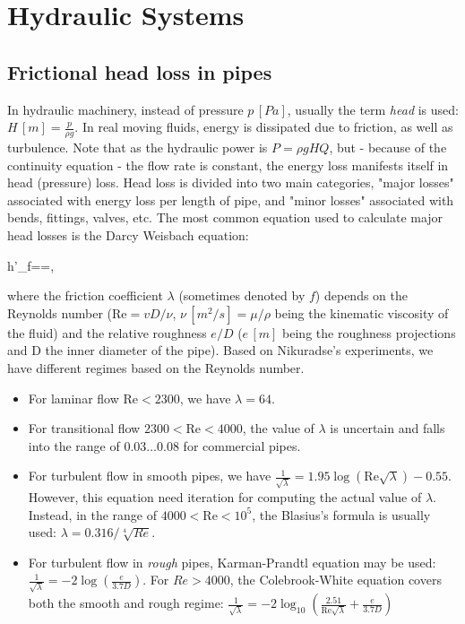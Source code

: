 \chapter{Hydraulic Systems} \label{sec:hydraulic_systems}

\section{Frictional head loss in pipes}\label{sec:frictionallosses}

In hydraulic machinery, instead of pressure $p\,[Pa]$, usually the term \emph{head} is used: $H\,[m]=\frac{p}{\rho g}$.
In real moving fluids, energy is dissipated due to friction, as well as turbulence. Note that as the hydraulic power is $P=\rho gHQ$, but - because of the continuity equation - the flow rate is constant, the energy loss manifests itself in head (pressure) loss.
Head loss is divided into two main categories, "major losses" associated with energy loss per length of pipe, and "minor losses" associated with bends, fittings, valves, etc. The most common equation used to calculate major head losses is the Darcy Weisbach equation:

\beq
h'_f=\lambda{}=\lambda{},
\eeq

where the friction coefficient $\lambda$ (sometimes denoted by $f$) depends on the Reynolds number ($\mathrm{Re}=vD/\nu$, $\nu\,[m^2/s]=\mu/\rho$ being the kinematic viscosity of the fluid) and the relative roughness $e/D$ ($e\,[m]$ being the roughness projections and D  the inner diameter of the pipe). Based on Nikuradse’s experiments, we have different regimes based on the Reynolds number.

\begin{itemize}
\item For laminar flow $\mathrm{Re} < 2300$, we have $\lambda=64$.
\item For transitional flow $2300 < \mathrm{Re} < 4000$, the value of $\lambda$ is uncertain and falls into the range of $0.03\ldots0.08$ for commercial pipes.
\item For turbulent flow in smooth pipes, we have $\frac{1}{\sqrt{\lambda}}=1.95\log(\mathrm{Re}\sqrt{\lambda})-0.55$.
However, this equation need iteration for computing the actual value of $\lambda$. Instead, in the range of $4000 < \mathrm{Re} < 10^5$, the Blasius’s formula is usually used: $\lambda=0.316/\sqrt[4]{Re}$.
\item For turbulent flow in \emph{rough} pipes, Karman-Prandtl equation  may be used: $\frac{1}{\sqrt{\lambda}}=-2\log\left(\frac{e}{3.7D}\right)$. For $Re>4000$, the  Colebrook-White  equation  covers  both the smooth  and  rough regime: $\frac{1}{\sqrt{\lambda}}=-2\log_{10}\left(\frac{2.51}{\mathrm{Re}\sqrt{\lambda}}+\frac{e}{3.7D}\right)$
\end{itemize}

